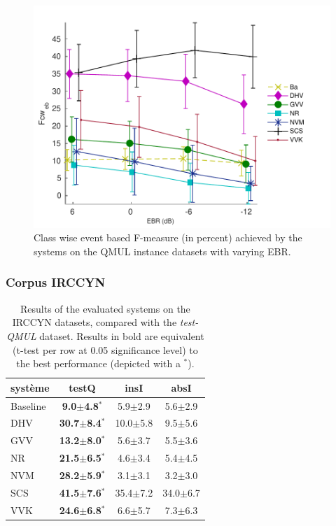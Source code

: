 \begin{figure}[t]
\begin{center}
\includegraphics[width=1\textwidth]{gfx/ch_7/ebr}
\caption{Class wise event based F-measure (in percent) achieved by the systems on the QMUL instance datasets with varying EBR.}
\label{fig:ebr} 
\end{center}
\end{figure}

\subsubsection{Corpus IRCCYN}

\begin{table}
\begin{center} 
\begin{tabular}{lccc}
système  & testQ & insI & absI \\ 
\hline 
Baseline & \textbf{9.0$\pm$4.8$^*$}  &  5.9$\pm$2.9 &  5.6$\pm$2.9 \\ 
DHV      & \textbf{30.7$\pm$8.4$^*$} & 10.0$\pm$5.8 &  9.5$\pm$5.6 \\ 
GVV      & \textbf{13.2$\pm$8.0$^*$} &  5.6$\pm$3.7 &  5.5$\pm$3.6 \\
NR       & \textbf{21.5$\pm$6.5$^*$} &  4.6$\pm$3.4 &  5.4$\pm$4.5 \\ 
NVM      & \textbf{28.2$\pm$5.9$^*$} &  3.1$\pm$3.1 &  3.2$\pm$3.0 \\ 
SCS      & \textbf{41.5$\pm$7.6$^*$} & 35.4$\pm$7.2 & 34.0$\pm$6.7 \\ 
VVK      & \textbf{24.6$\pm$6.8$^*$} &  6.6$\pm$5.7 &  7.3$\pm$6.3 \\ 
\hline
\end{tabular} 
\end{center}  
\caption{Results of the evaluated systems on the IRCCYN datasets, compared with the \emph{test-QMUL} dataset. Results in bold are equivalent (t-test per row at 0.05 significance level) to the best performance (depicted with a $^*$).}
\label{tab:irccyn} 
\end{table} 

